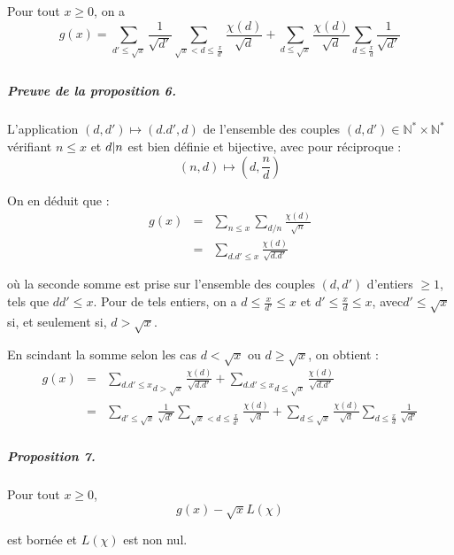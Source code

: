 Pour tout $x \geqslant 0$, on a
\[  g (x) = \underset{d' \leqslant \sqrt{x}}{\sum}  \frac{1}{\sqrt{d'}}
   \underset{}{\underset{\sqrt{x} < d \leqslant \frac{x}{d'}}{\sum}}
   \frac{\chi (d)}{\sqrt{d}} + \underset{d \leqslant \sqrt{x}}{\sum} 
   \frac{\chi (d)}{\sqrt{d}} \underset{}{\underset{d \leqslant
   \frac{x}{d}}{\sum}} \frac{1}{\sqrt{d'}} \]


\subparagraph{Preuve de la proposition 6.}

L'application $(d, d') \longmapsto (d.d', d)$ de l'ensemble des couples $(d,
d') \in \mathbb{N}^{\ast} \times \mathbb{N}^{\ast}$ v{\'e}rifiant $n \leqslant
x$ et $d |  n$ est bien d{\'e}finie et bijective, avec pour
r{\'e}ciproque :
\[ (n, d) \longmapsto \left( d, \frac{n}{d} \right) \]


On en d{\'e}duit que :
\begin{eqnarray*}
  g (x) & = & \underset{n \leqslant x}{\sum}  \underset{d / n}{\sum}
  \frac{\chi (d)}{\sqrt{n}}\\
  & = & \underset{d.d' \leqslant x}{\sum} \frac{\chi (d)}{\sqrt{d.d'}}
\end{eqnarray*}


o{\`u} la seconde somme est prise sur l'ensemble des couples $(d, d')$
d'entiers $\geqslant 1$, tels que $d d' \leqslant x$. Pour de tels entiers, on
a $d \leqslant \frac{x}{d'} \leqslant x$ et $d' \leqslant \frac{x}{d}
\leqslant x$, avec\quad$d' \leqslant \sqrt{x}$ si, et seulement si, $d >
\sqrt{x}$.

En scindant la somme selon les cas $d < \sqrt{x}$ ou $d \geqslant \sqrt{x}$,
on obtient :
\begin{eqnarray*}
  g (x) & = & \underset{d > \sqrt{x}}{\underset{d.d' \leqslant x}{\sum}}
  \frac{\chi (d)}{\sqrt{d.d'}} + \underset{d \leqslant
  \sqrt{x}}{\underset{d.d' \leqslant x}{\sum}} \frac{\chi (d)}{\sqrt{d.d'}}\\
  & = & \underset{d' \leqslant \sqrt{x}}{\sum}  \frac{1}{\sqrt{d'}}
  \underset{}{\underset{\sqrt{x} < d \leqslant \frac{x}{d'}}{\sum}} \frac{\chi
  (d)}{\sqrt{d}} + \underset{d \leqslant \sqrt{x}}{\sum}  \frac{\chi
  (d)}{\sqrt{d}} \underset{}{\underset{d \leqslant \frac{x}{d}}{\sum}}
  \frac{1}{\sqrt{d'}}
\end{eqnarray*}


\subparagraph{Proposition 7.}

Pour tout $x \geqslant 0$,
\[ g (x) - \sqrt{x} L (\chi) \]


est born{\'e}e et $L (\chi)$ est non nul.

